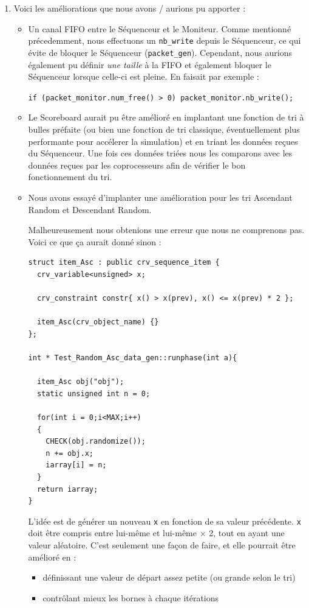 \documentclass[a4paper, 10pt]{article}
\begin{document}
\begin{enumerate}
	\item Voici les améliorations que nous avons / aurions pu apporter :
		\begin{itemize}
			\item Un canal FIFO entre le Séquenceur et le Moniteur. Comme mentionné
				précedemment, nous effectuons un \texttt{nb\_write} depuis le Séquenceur,
				ce qui évite de bloquer le Séquenceur (\texttt{packet\_gen}).
				Cependant, nous aurions également pu définir \emph{une taille} à la FIFO
				et également bloquer le Séquenceur lorsque celle-ci est pleine. En faisait
				par exemple :

				\begin{center}
					\verb|if (packet_monitor.num_free() > 0) packet_monitor.nb_write();|
				\end{center}

			\item Le Scoreboard aurait pu être amélioré en implantant une fonction de tri à
				bulles préfaite (ou bien une fonction de tri classique, éventuellement
				plus performante pour accélerer la simulation) et en triant les données
				reçues du Séquenceur. Une fois ces données triées nous les comparons avec
				les données reçues par les coprocesseurs afin de vérifier le bon
				fonctionnement du tri.

			\item Nous avons essayé d'implanter une amélioration pour les tri Ascendant
				Random et Descendant Random. 

				Malheureusement nous obtenions une erreur que nous ne comprenons pas.
				Voici ce que ça aurait donné sinon :

\begin{lstlisting}
struct item_Asc : public crv_sequence_item {
  crv_variable<unsigned> x;

  crv_constraint constr{ x() > x(prev), x() <= x(prev) * 2 };

  item_Asc(crv_object_name) {}
};

int * Test_Random_Asc_data_gen::runphase(int a){

  item_Asc obj("obj");
  static unsigned int n = 0;
  
  for(int i = 0;i<MAX;i++)
  {
    CHECK(obj.randomize());
    n += obj.x;
    iarray[i] = n;
  }
  return iarray;
}

\end{lstlisting}
			
			L'idée est de générer un nouveau \texttt{x} en fonction de sa valeur
			précédente. \texttt{x} doit être compris entre lui-même et lui-même $\times$
			2, tout en ayant une valeur aléatoire. C'est seulement une façon de faire, et
			elle pourrait être amélioré en :
			\begin{itemize}
				\item définissant une valeur de départ assez petite (ou grande selon le
					tri)
				\item contrôlant mieux les bornes à chaque itérations
			\end{itemize}

		\end{itemize}
\end{enumerate}
\end{document}

